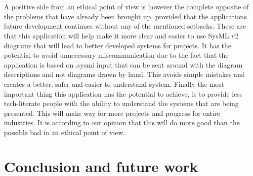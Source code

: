 \documentclass{article}
\begin{document}
\\\\
A positive side from an ethical point of view is however the complete opposite of the problems that have already been brought up, provided that the applications future development continues without any of the mentioned setbacks. These are that this application will help make it more clear and easier to use SysML v2 diagrams that will lead to better developed systems for projects. It has the potential to avoid unnecessary miscommunication due to the fact that the application is based on .sysml input that can be sent around with the diagram descriptions and not diagrams drawn by hand. This avoids simple mistakes and creates a better, safer and easier to understand system. Finally the most important thing this application has the potential to achieve, is to provide less tech-literate people with the ability to understand the systems that are being presented. This will make way for more projects and progress for entire industries. It is according to our opinion that this will do more good than the possible bad in an ethical point of view.

\newpage
\section{Conclusion and future work}
\end{document}
